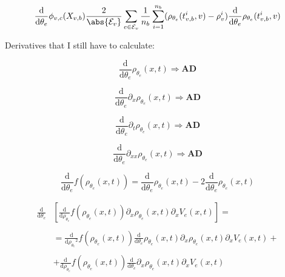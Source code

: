 \begin{equation*}
    \frac{\mathrm{d}}{\mathrm{d} \theta_e} \phi_{v,c} (X_{v,b}) \frac{2}{\abs{\mathcal{E}_v}} \sum_{e \in \mathcal{E}_v} \frac{1}{n_b} \sum_{i=1}^{n_b} ( \rho_{\theta_e} (t_{v,b}^i, v) - \rho_{v}^i) \frac{\mathrm{d}}{\mathrm{d} \theta_e} \rho_{\theta_e} (t_{v,b}^i, v)
\end{equation*}

Derivatives that I still have to calculate:

\begin{equation*}
    \frac{\mathrm{d}}{\mathrm{d} \theta_e} \rho_{\theta_e}(x, t) \Rightarrow \textbf{AD}
\end{equation*}

\begin{equation*}
    \frac{\mathrm{d}}{\mathrm{d} \theta_e} \partial_x \rho_{\theta_e}(x, t) \Rightarrow \textbf{AD}
\end{equation*}

\begin{equation*}
    \frac{\mathrm{d}}{\mathrm{d} \theta_e} \partial_t \rho_{\theta_e}(x, t) \Rightarrow \textbf{AD}
\end{equation*}

\begin{equation*}
    \frac{\mathrm{d}}{\mathrm{d} \theta_e} \partial_{xx} \rho_{\theta_e}(x, t) \Rightarrow \textbf{AD}
\end{equation*}

\begin{equation*}
    \frac{\mathrm{d}}{\mathrm{d} \theta_e} f(\rho_{\theta_e}(x, t)) = \frac{\mathrm{d}}{\mathrm{d} \theta_e} \rho_{\theta_e}(x, t) - 2 \frac{\mathrm{d}}{\mathrm{d} \theta_e} \rho_{\theta_e}(x, t)
\end{equation*}

\begin{align*}
    \frac{\mathrm{d}}{\mathrm{d} \theta_e} & [\frac{\mathrm{d}}{\mathrm{d} \rho_{\theta_e}} f(\rho_{\theta_e}(x, t)) \partial_x \rho_{\theta_e}(x, t) \partial_x V_e(x, t)] = \\
    \\ \quad & = \frac{\mathrm{d}}{\mathrm{d} {\rho_{\theta_e}}^2} f(\rho_{\theta_e}(x, t)) \frac{\mathrm{d}}{\mathrm{d} \theta_e} \rho_{\theta_e}(x, t) \partial_x \rho_{\theta_e}(x, t) \partial_x V_e(x, t) + \\
    \\ \quad & + \frac{\mathrm{d}}{\mathrm{d} \rho_{\theta_e}} f(\rho_{\theta_e}(x, t)) \frac{\mathrm{d}}{\mathrm{d} \theta_e} \partial_x \rho_{\theta_e}(x, t) \partial_x V_e(x, t)
\end{align*}



